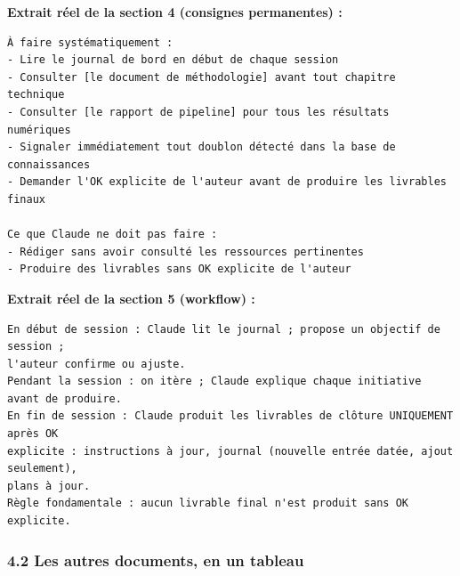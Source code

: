 \documentclass[
  french,
  11pt,
  a4paper,
]{article}
\begin{document}
\textbf{Extrait réel de la section 4 (consignes permanentes) :}

\begin{Verbatim}[breaklines=true,breakanywhere=true,fontsize=\small,frame=leftline,framerule=1.6pt,rulecolor=\color{credixblue},framesep=3mm,xleftmargin=2mm,xrightmargin=1mm]
À faire systématiquement :
- Lire le journal de bord en début de chaque session
- Consulter [le document de méthodologie] avant tout chapitre technique
- Consulter [le rapport de pipeline] pour tous les résultats numériques
- Signaler immédiatement tout doublon détecté dans la base de connaissances
- Demander l'OK explicite de l'auteur avant de produire les livrables finaux

Ce que Claude ne doit pas faire :
- Rédiger sans avoir consulté les ressources pertinentes
- Produire des livrables sans OK explicite de l'auteur
\end{Verbatim}

\textbf{Extrait réel de la section 5 (workflow) :}

\begin{Verbatim}[breaklines=true,breakanywhere=true,fontsize=\small,frame=leftline,framerule=1.6pt,rulecolor=\color{credixblue},framesep=3mm,xleftmargin=2mm,xrightmargin=1mm]
En début de session : Claude lit le journal ; propose un objectif de session ;
l'auteur confirme ou ajuste.
Pendant la session : on itère ; Claude explique chaque initiative avant de produire.
En fin de session : Claude produit les livrables de clôture UNIQUEMENT après OK
explicite : instructions à jour, journal (nouvelle entrée datée, ajout seulement),
plans à jour.
Règle fondamentale : aucun livrable final n'est produit sans OK explicite.
\end{Verbatim}

\subsubsection{4.2 Les autres documents, en un
tableau}\label{42-les-autres-documents-en-un-tableau}
\end{document}
